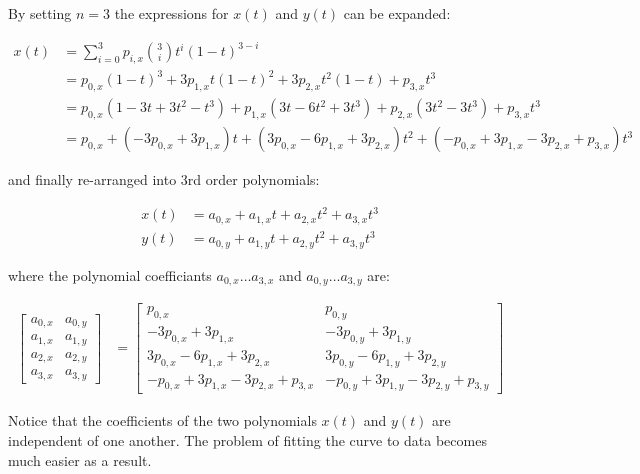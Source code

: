 By setting $n=3$ the expressions for $x(t)$ and $y(t)$ can be expanded:

\begin{align}
    x(t) &= \sum_{i=0}^3 p_{i,x} {3\choose i} t^i(1-t)^{3-i} \\
         &= p_{0,x}(1-t)^3 + 3p_{1,x}t(1-t)^2 + 3p_{2,x}t^2(1-t) + p_{3,x}t^3 \\
         &= p_{0,x}(1-3t+3t^2-t^3) + p_{1,x}(3t-6t^2+3t^3) + p_{2,x}(3t^2-3t^3) + p_{3,x}t^3 \\
         &= p_{0,x} + (-3p_{0,x} +3p_{1,x})t + (3p_{0,x} -6p_{1,x} +3p_{2,x})t^2 + (-p_{0,x}+3p_{1,x}-3p_{2,x}+p_{3,x})t^3
\end{align}

and finally re-arranged into 3rd order polynomials:

\begin{align}
    x(t) &= a_{0,x} + a_{1,x} t + a_{2,x} t^2 + a_{3,x} t^3 \label{eq:bezier_x} \\
    y(t) &= a_{0,y} + a_{1,y} t + a_{2,y} t^2 + a_{3,y} t^3 \label{eq:bezier_y}
\end{align}

where the polynomial coefficiants $a_{0,x} \ldots a_{3,x}$ and $a_{0,y} \ldots a_{3,y}$ are:

\begin{align}
    \begin{bmatrix}
        a_{0,x} & a_{0,y} \\
        a_{1,x} & a_{1,y} \\
        a_{2,x} & a_{2,y} \\
        a_{3,x} & a_{3,y}
    \end{bmatrix}
    &=
    \left[\begin{array}{ll}
        p_{0,x}                                   & p_{0,y} \\
        -3p_{0,x} + 3p_{1,x}                      & -3p_{0,y} + 3p_{1,y} \\
        3p_{0,x}  - 6p_{1,x} + 3p_{2,x}           & 3p_{0,y}  - 6p_{1,y} + 3p_{2,y} \\
        -p_{0,x}  + 3p_{1,x} - 3p_{2,x} + p_{3,x} & -p_{0,y}  + 3p_{1,y} - 3p_{2,y} + p_{3,y}
    \end{array}\right]
\end{align}

Notice that  the  coefficients  of  the  two  polynomials $x(t)$ and $y(t)$ are
independent of one another. The problem of  fitting  the  curve to data becomes
much easier as a result.

